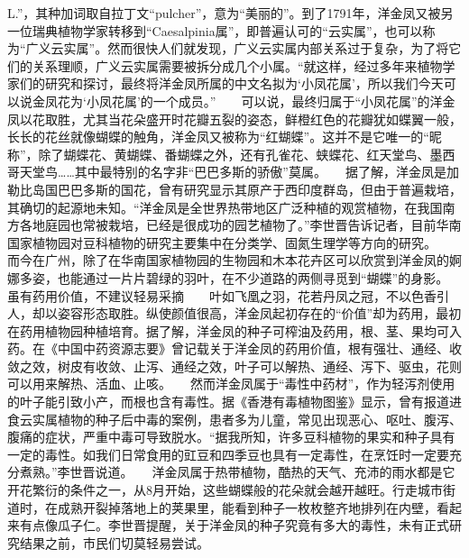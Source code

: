 \documentclass[zihao = -4]{exam-zh}
\begin{document}
\begin{material}
L.”，其种加词取自拉丁文“pulcher”，意为“美丽的”。到了1791年，洋金凤又被另一位瑞典植物学家转移到“Caesalpinia属”，即普遍认可的“云实属”，也可以称为“广义云实属”。然而很快人们就发现，广义云实属内部关系过于复杂，为了将它们的关系理顺，广义云实属需要被拆分成几个小属。“就这样，经过多年来植物学家们的研究和探讨，最终将洋金凤所属的中文名拟为‘小凤花属’，所以我们今天可以说金凤花为‘小凤花属’的一个成员。”　　可以说，最终归属于“小凤花属”的洋金凤以花取胜，尤其当花朵盛开时花瓣五裂的姿态，鲜橙红色的花瓣犹如蝶翼一般，长长的花丝就像蝴蝶的触角，洋金凤又被称为“红蝴蝶”。这并不是它唯一的“昵称”，除了蝴蝶花、黄蝴蝶、番蝴蝶之外，还有孔雀花、蛱蝶花、红天堂鸟、墨西哥天堂鸟……其中最特别的名字非“巴巴多斯的骄傲”莫属。　　据了解，洋金凤是加勒比岛国巴巴多斯的国花，曾有研究显示其原产于西印度群岛，但由于普遍栽培，其确切的起源地未知。“洋金凤是全世界热带地区广泛种植的观赏植物，在我国南方各地庭园也常被栽培，已经是很成功的园艺植物了。”李世晋告诉记者，目前华南国家植物园对豆科植物的研究主要集中在分类学、固氮生理学等方向的研究。　　而今在广州，除了在华南国家植物园的生物园和木本花卉区可以欣赏到洋金凤的婀娜多姿，也能通过一片片碧绿的羽叶，在不少道路的两侧寻觅到“蝴蝶”的身影。　　虽有药用价值，不建议轻易采摘　　叶如飞凰之羽，花若丹凤之冠，不以色香引人，却以姿容形态取胜。纵使颜值很高，洋金凤起初存在的“价值”却为药用，最初在药用植物园种植培育。据了解，洋金凤的种子可榨油及药用，根、茎、果均可入药。在《中国中药资源志要》曾记载关于洋金凤的药用价值，根有强壮、通经、收敛之效，树皮有收敛、止泻、通经之效，叶子可以解热、通经、泻下、驱虫，花则可以用来解热、活血、止咳。　　然而洋金凤属于“毒性中药材”，作为轻泻剂使用的叶子能引致小产，而根也含有毒性。据《香港有毒植物图鉴》显示，曾有报道进食云实属植物的种子后中毒的案例，患者多为儿童，常见出现恶心、呕吐、腹泻、腹痛的症状，严重中毒可导致脱水。“据我所知，许多豆科植物的果实和种子具有一定的毒性。如我们日常食用的豇豆和四季豆也具有一定毒性，在烹饪时一定要充分煮熟。”李世晋说道。　　洋金凤属于热带植物，酷热的天气、充沛的雨水都是它开花繁衍的条件之一，从8月开始，这些蝴蝶般的花朵就会越开越旺。行走城市街道时，在成熟开裂掉落地上的荚果里，能看到种子一枚枚整齐地排列在内壁，看起来有点像瓜子仁。李世晋提醒，关于洋金凤的种子究竟有多大的毒性，未有正式研究结果之前，市民们切莫轻易尝试。
\\
       \end{material}
\end{document}

